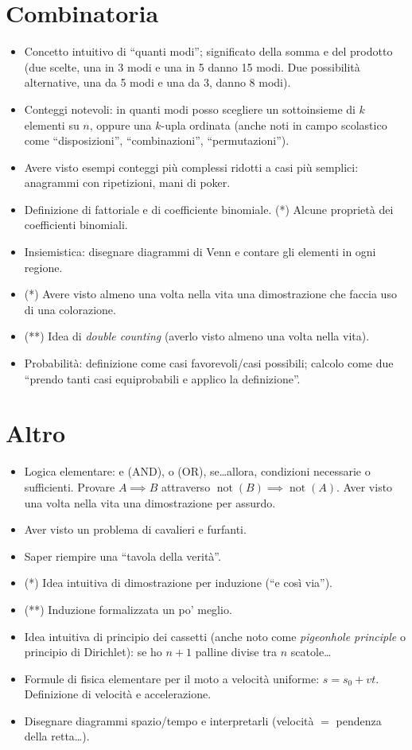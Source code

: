\documentclass[a4paper,10pt]{paper}
\renewcommand{\star}{(*)}
\newcommand{\sstar}{(**)}
\begin{document}
\section{Combinatoria}
\begin{itemize}
 \item Concetto intuitivo di ``quanti modi''; significato della somma e del prodotto (due scelte, una in 3 modi e una in 5 danno 15 modi. Due possibilità alternative, una da 5 modi e una da 3, danno 8 modi).
 \item Conteggi notevoli: in quanti modi posso scegliere un sottoinsieme di $k$ elementi su $n$, oppure una $k$-upla ordinata (anche noti in campo scolastico come ``disposizioni'', ``combinazioni'', ``permutazioni'').
 \item Avere visto esempi conteggi più complessi ridotti a casi più semplici: anagrammi con ripetizioni, mani di poker.
 \item Definizione di fattoriale e di coefficiente binomiale. \star{} Alcune proprietà dei coefficienti binomiali.
 \item Insiemistica: disegnare diagrammi di Venn e contare gli elementi in ogni regione.
 \item \star{} Avere visto almeno una volta nella vita una dimostrazione che faccia uso di una colorazione.
 \item \sstar{} Idea di \emph{double counting} (averlo visto almeno una volta nella vita).
 \item Probabilità: definizione come casi favorevoli/casi possibili; calcolo come due ``prendo tanti casi equiprobabili e applico la definizione''.
\end{itemize}

\section{Altro}
\begin{itemize}
 \item Logica elementare: e (AND), o (OR), se\dots{}allora, condizioni necessarie o sufficienti. Provare $A \implies B$ attraverso $\operatorname{not}(B)\implies \operatorname{not}(A)$. Aver visto una volta nella vita una dimostrazione per assurdo.
 \item Aver visto un problema di cavalieri e furfanti.
 \item Saper riempire una ``tavola della verità''.
 \item \star{} Idea intuitiva di dimostrazione per induzione (``e così via'').
 \item \sstar{} Induzione formalizzata un po' meglio.
 \item Idea intuitiva di principio dei cassetti (anche noto come \emph{pigeonhole principle} o principio di Dirichlet): se ho $n+1$ palline divise tra $n$ scatole\dots
 \item Formule di fisica elementare per il moto a velocità uniforme: $s=s_0+vt$. Definizione di velocità e accelerazione.
 \item Disegnare diagrammi spazio/tempo e interpretarli (velocità $=$ pendenza della retta\dots).
\end{itemize}
\end{document}
